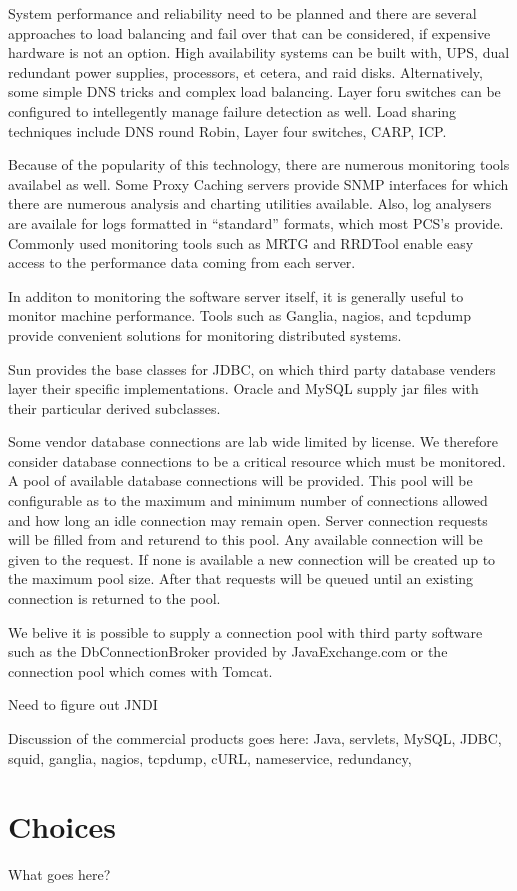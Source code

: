 System performance and reliability need to be planned and there are
several approaches to load balancing and fail over that can be
considered, if expensive hardware is not an option. High availability
systems can be built with, UPS, dual redundant power supplies,
processors, et cetera, and raid disks. Alternatively, some simple DNS
tricks and complex load balancing. Layer foru switches can be
configured to intellegently manage failure detection as well.  Load
sharing techniques include DNS round Robin, Layer four switches, CARP,
ICP.

Because of the popularity of this technology, there are numerous
monitoring tools availabel as well. Some Proxy Caching servers provide
SNMP interfaces for which there are numerous analysis and charting
utilities available. Also, log analysers are availale for logs
formatted in ``standard'' formats, which most PCS's provide. Commonly
used monitoring tools such as MRTG and RRDTool enable easy access to
the performance data coming from each server.

In additon to monitoring the software server itself, it is generally
useful to monitor machine performance. Tools such as Ganglia, nagios,
and tcpdump provide convenient solutions for monitoring distributed
systems.

Sun provides the base classes for JDBC, on which third party database
venders layer their specific implementations. Oracle and MySQL supply
jar files with their particular derived subclasses.

Some vendor database connections are lab wide limited by license. We
therefore consider database connections to be a critical resource
which must be monitored.  A pool of available database connections
will be provided.  This pool will be configurable as to the maximum
and minimum number of connections allowed and how long an idle
connection may remain open.  Server connection requests will be filled
from and returend to this pool.  Any available connection will be
given to the request.  If none is available a new connection will be
created up to the maximum pool size.  After that requests will be
queued until an existing connection is returned to the pool.

We belive it is possible to supply a connection pool with third party
software such as the DbConnectionBroker provided by JavaExchange.com
or the connection pool which comes with Tomcat.

Need to figure out JNDI

Discussion of the commercial products goes here: Java, servlets,
MySQL, JDBC, squid, ganglia, nagios, tcpdump, cURL, nameservice,
redundancy, \etc%


\section{Choices}

\begin{fixme}
What goes here?
\end{fixme}


